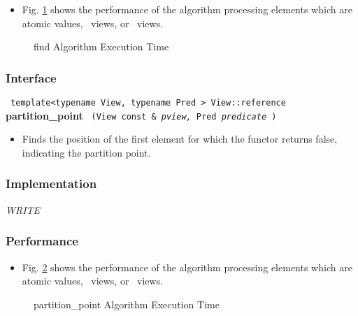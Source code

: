\begin{itemize}
\item
Fig. \ref{fig:find-alg-exec-exper}
shows the performance of the algorithm processing
elements which are atomic values, \stl\ views, or \stapl\ views.
\end{itemize}

\begin{figure}[p]
\caption{find Algorithm Execution Time}
\label{fig:find-alg-exec-exper}
\end{figure}

 
\subsubsection{Interface} %

\noindent
\texttt{%
template<typename View, typename Pred >
\newline
View::reference 
}
\newline
\textbf{partition\_point}%
\texttt{%
(View const \&
\textit{pview,}%
Pred 
\textit{predicate}%
)
}

\begin{itemize}
\item
Finds the position of the first element for which the functor returns false, indicating the partition point. 
\end{itemize}

\subsubsection{Implementation} %

\textit{WRITE}

\subsubsection{Performance} %

\begin{itemize}
\item
Fig. \ref{fig:part-pt-alg-exec-exper}
shows the performance of the algorithm processing
elements which are atomic values, \stl\ views, or \stapl\ views.
\end{itemize}

\begin{figure}[p]
\caption{partition\_point Algorithm Execution Time}
\label{fig:part-pt-alg-exec-exper}
\end{figure}

